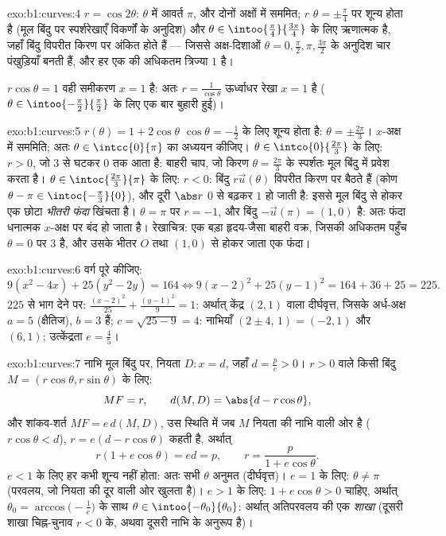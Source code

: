 \begin{solution}{exo:b1:curves:4}
$r = \cos 2\theta$: $\theta$ में आवर्त $\pi$, और दोनों अक्षों में सममित; $r$
$\theta = \pm\frac\pi4$ पर शून्य होता है (मूल बिंदु पर स्पर्शरेखाएँ विकर्णों
के अनुदिश) और $\theta \in \intoo{\frac\pi4}{\frac{3\pi}{4}}$ के लिए ऋणात्मक
है, जहाँ बिंदु विपरीत किरण पर अंकित होते हैं --- जिससे अक्ष-दिशाओं $\theta =
0, \frac\pi2, \pi, \frac{3\pi}{2}$ के अनुदिश चार पंखुड़ियाँ बनती हैं, और हर
एक की अधिकतम त्रिज्या $1$ है।

$r\cos\theta = 1$ वही समीकरण $x = 1$ है: अतः  $r =
\frac{1}{\cos\theta}$ ऊर्ध्वाधर रेखा $x = 1$ है ($\theta \in
\intoo{-\frac\pi2}{\frac\pi2}$ के लिए एक बार बुहारी हुई)।
\end{solution}

\begin{solution}{exo:b1:curves:5}
$r(\theta) = 1 + 2\cos\theta$ $\cos\theta = -\frac12$ के लिए शून्य होता है:
$\theta = \pm\frac{2\pi}{3}$। $x$-अक्ष में सममिति; अतः $\theta \in
\intcc{0}{\pi}$ का अध्ययन कीजिए। $\theta \in \intco{0}{\frac{2\pi}{3}}$ के
लिए: $r > 0$, जो $3$ से घटकर $0$ तक आता है: बाहरी चाप, जो किरण $\theta =
\frac{2\pi}{3}$ के स्पर्शतः मूल बिंदु में प्रवेश करता है। $\theta \in
\intoc{\frac{2\pi}{3}}{\pi}$ के लिए: $r < 0$: बिंदु $r\vec u(\theta)$ विपरीत
किरण पर बैठते हैं (कोण $\theta - \pi \in \intoc{-\frac\pi3}{0}$), और दूरी
$\abs r$ $0$ से बढ़कर $1$ हो जाती है: इससे मूल बिंदु से होकर एक छोटा
\emph{भीतरी फंदा} खिंचता है। $\theta = \pi$ पर $r = -1$, और बिंदु $-\vec
u(\pi) = (1, 0)$ है: अतः फंदा धनात्मक $x$-अक्ष पर बंद हो जाता है। रेखाचित्र:
एक बड़ा हृदय-जैसा बाहरी वक्र, जिसकी अधिकतम पहुँच $\theta = 0$ पर $3$ है, और
उसके भीतर $O$ तथा $(1,0)$ से होकर जाता एक फंदा।
\end{solution}

\begin{solution}{exo:b1:curves:6}
वर्ग पूरे कीजिए:
\[
9(x^2 - 4x) + 25(y^2 - 2y) = 164
\iff 9(x-2)^2 + 25(y-1)^2 = 164 + 36 + 25 = 225 .
\]
$225$ से भाग देने पर: $\frac{(x-2)^2}{25} + \frac{(y-1)^2}{9} = 1$: अर्थात्
केंद्र $(2, 1)$ वाला दीर्घवृत्त, जिसके अर्ध-अक्ष $a = 5$ (क्षैतिज), $b = 3$
हैं; $c = \sqrt{25 - 9} = 4$: नाभियाँ $(2 \pm 4,\, 1) = (-2, 1)$ और $(6,
1)$; उत्केंद्रता $e = \frac45$।
\end{solution}

\begin{solution}{exo:b1:curves:7}
नाभि मूल बिंदु पर, नियता $D: x = d$, जहाँ $d = \frac pe > 0$। $r > 0$ वाले
किसी बिंदु $M = (r\cos\theta, r\sin\theta)$ के लिए:
\[
MF = r,
\qquad
d(M, D) = \abs{d - r\cos\theta},
\]
और शांकव-शर्त $MF = e\,d(M, D)$, उस स्थिति में जब $M$ नियता की नाभि वाली ओर
है ($r\cos\theta < d$), $r = e(d - r\cos\theta)$ कहती है, अर्थात्
\[
r(1 + e\cos\theta) = ed = p,
\qquad
r = \frac{p}{1 + e\cos\theta} .
\]
$e < 1$ के लिए हर कभी शून्य नहीं होता: अतः सभी $\theta$ अनुमत (दीर्घवृत्त)।
$e = 1$ के लिए: $\theta \neq \pi$ (परवलय, जो नियता की दूर वाली ओर खुलता है)।
$e > 1$ के लिए: $1 + e\cos\theta > 0$ चाहिए, अर्थात् $\theta_0 =
\arccos\bigl(-\frac1e\bigr)$ के साथ $\theta \in
\intoo{-\theta_0}{\theta_0}$: अर्थात् अतिपरवलय की एक \emph{शाखा} (दूसरी शाखा
चिह्न-चुनाव $r < 0$ के, अथवा दूसरी नाभि के अनुरूप है)।
\end{solution}

